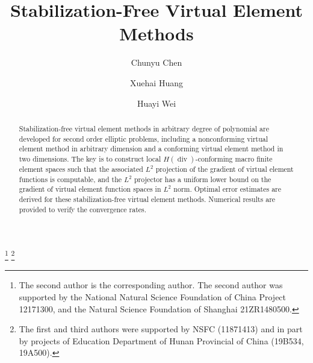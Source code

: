 \documentclass[10pt]{amsart}
\renewcommand{\div}{\operatorname{div}}
\numberwithin{equation}{section}
\begin{document}
\title[Stabilization-Free VEM]{Stabilization-Free Virtual Element Methods}
\author{Chunyu Chen}%
\address{Hunan Key Laboratory for Computation and Simulation in Science and Engineering; School of Mathematics and Computational Science, Xiangtan University, Xiangtan 411105, P.R.China }%
 \author{Xuehai Huang}%
 \address{School of Mathematics, Shanghai University of Finance and Economics, Shanghai 200433, China}%
\author{Huayi Wei}%
\address{Hunan Key Laboratory for Computation and Simulation in Science and Engineering; School of Mathematics and Computational Science, Xiangtan University, Xiangtan 411105, P.R.China }%

 \thanks{The second author is the corresponding author. The second author was supported by the National Natural Science Foundation of China Project 12171300, and the Natural Science Foundation of Shanghai 21ZR1480500.}
 \thanks{The first and third authors were supported by NSFC (11871413) and in part by projects
of Education Department of Hunan Provincial of China (19B534, 19A500).}

\makeatletter
{}
\makeatother
{}


\begin{abstract}
Stabilization-free virtual element methods in arbitrary degree of polynomial are developed for second order elliptic problems, including a nonconforming virtual element method in arbitrary dimension and a conforming virtual element method in two dimensions.
The key is to construct local $H(\div)$-conforming macro finite element spaces such that the associated $L^2$ projection of the gradient of virtual element functions is computable, and the $L^2$ projector has a uniform lower bound on the gradient of virtual element function spaces in $L^2$ norm.
Optimal error estimates are derived for these stabilization-free virtual element methods.
Numerical results are provided to verify the convergence rates.
\end{abstract}
\end{document}
